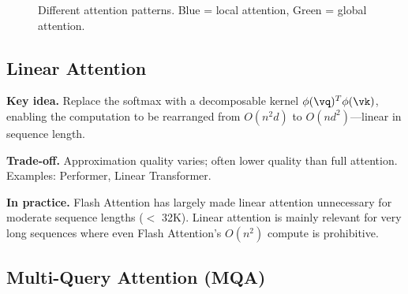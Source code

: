 \begin{figure}[H]
\centering
{}
\caption{Different attention patterns. Blue = local attention, Green = global attention.}
\label{fig:attention_patterns}
\end{figure}

\subsection{Linear Attention}

\textbf{Key idea.} Replace the softmax with a decomposable kernel $\phi(\vq)^T \phi(\vk)$, enabling the computation to be rearranged from $O(n^2 d)$ to $O(n d^2)$---linear in sequence length.

\textbf{Trade-off.} Approximation quality varies; often lower quality than full attention. Examples: Performer, Linear Transformer.

\textbf{In practice.} Flash Attention has largely made linear attention unnecessary for moderate sequence lengths ($<$ 32K). Linear attention is mainly relevant for very long sequences where even Flash Attention's $O(n^2)$ compute is prohibitive.

\subsection{Multi-Query Attention (MQA)}


